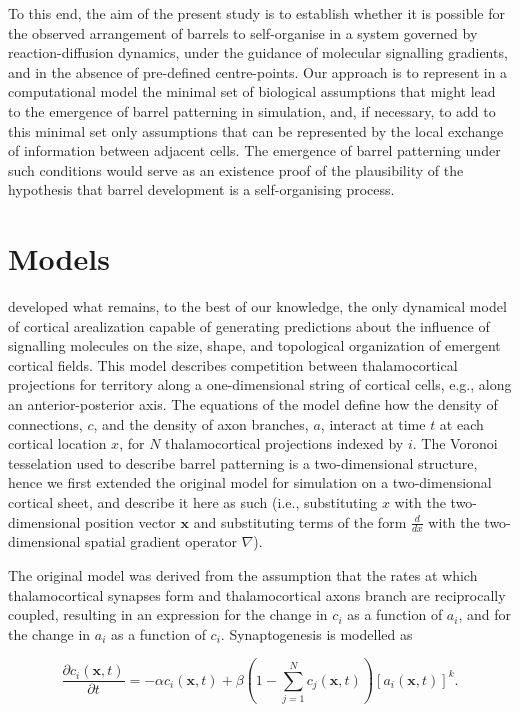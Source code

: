 \documentclass[a4paper,11pt]{article}
\newcommand{\mb}[1]{\mathbf{#1}}
\begin{document}
To this end, the aim of the present study is to establish whether it is
possible for the observed arrangement of barrels to self-organise in a system
governed by reaction-diffusion dynamics, under the guidance of molecular
signalling gradients, and in the absence of pre-defined centre-points. Our
approach is to represent in a computational model the minimal set of
biological assumptions that might lead to the emergence of barrel patterning
in simulation, and, if necessary, to add to this minimal set only assumptions
that can be represented by the local exchange of information between adjacent
cells. The emergence of barrel patterning under such conditions would serve as
an existence proof of the plausibility of the hypothesis that barrel
development is a self-organising process.

\section*{Models}

\cite{Karbowski2004} developed what remains, to the best of our knowledge, the
only dynamical model of cortical arealization capable of generating
predictions about the influence of signalling molecules on the size, shape,
and topological organization of emergent cortical fields. This model describes
competition between thalamocortical projections for territory along a
one-dimensional string of cortical cells, e.g., along an anterior-posterior
axis. The equations of the model define how the density of connections, $c$,
and the density of axon branches, $a$, interact at time $t$ at each cortical
location $x$, for $N$ thalamocortical projections indexed by $i$. The Voronoi
tesselation used to describe barrel patterning is a two-dimensional structure,
hence we first extended the original model for simulation on a two-dimensional
cortical sheet, and describe it here as such (i.e., substituting $x$ with the
two-dimensional position vector $\mb{x}$ and substituting terms of the form
$\frac{d}{dx}$ with the two-dimensional spatial gradient operator $\nabla$).

The original model was derived from the assumption that the rates at which
thalamocortical synapses form and thalamocortical axons branch are
reciprocally coupled, resulting in an expression for the change in $c_i$ as a
function of $a_i$, and for the change in $a_i$ as a function of
$c_i$. Synaptogenesis is modelled as

\begin{equation} \label{eq:Karb2DExt_dc}
\frac{\partial c_i(\mb{x},t)}{\partial t} =-\alpha c_i(\mb{x},t) +\beta  \left(1 - \sum_{j=1}^{N} c_j(\mb{x}, t)\right)[a_i(\mb{x},t)]^k.
\end{equation}
\end{document}
